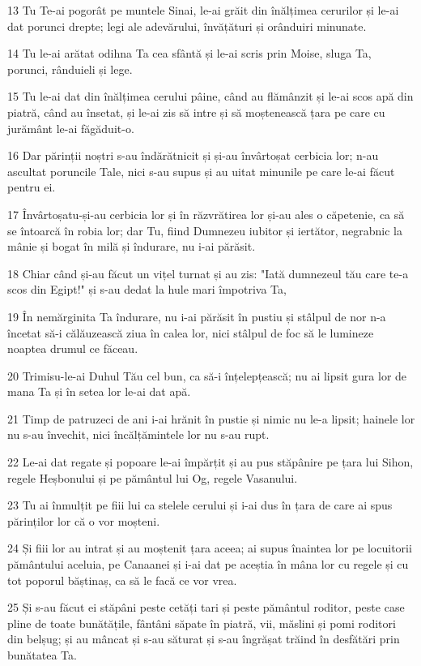 \par 13 Tu Te-ai pogorât pe muntele Sinai, le-ai grăit din înălțimea cerurilor și le-ai dat porunci drepte; legi ale adevărului, învățături și orânduiri minunate.
\par 14 Tu le-ai arătat odihna Ta cea sfântă și le-ai scris prin Moise, sluga Ta, porunci, rânduieli și lege.
\par 15 Tu le-ai dat din înălțimea cerului pâine, când au flămânzit și le-ai scos apă din piatră, când au însetat, și le-ai zis să intre și să moștenească țara pe care cu jurământ le-ai făgăduit-o.
\par 16 Dar părinții noștri s-au îndărătnicit și și-au învârtoșat cerbicia lor; n-au ascultat poruncile Tale, nici s-au supus și au uitat minunile pe care le-ai făcut pentru ei.
\par 17 Învârtoșatu-și-au cerbicia lor și în răzvrătirea lor și-au ales o căpetenie, ca să se întoarcă în robia lor; dar Tu, fiind Dumnezeu iubitor și iertător, negrabnic la mânie și bogat în milă și îndurare, nu i-ai părăsit.
\par 18 Chiar când și-au făcut un vițel turnat și au zis: "Iată dumnezeul tău care te-a scos din Egipt!" și s-au dedat la hule mari împotriva Ta,
\par 19 În nemărginita Ta îndurare, nu i-ai părăsit în pustiu și stâlpul de nor n-a încetat să-i călăuzească ziua în calea lor, nici stâlpul de foc să le lumineze noaptea drumul ce făceau.
\par 20 Trimisu-le-ai Duhul Tău cel bun, ca să-i înțelepțească; nu ai lipsit gura lor de mana Ta și în setea lor le-ai dat apă.
\par 21 Timp de patruzeci de ani i-ai hrănit în pustie și nimic nu le-a lipsit; hainele lor nu s-au învechit, nici încălțămintele lor nu s-au rupt.
\par 22 Le-ai dat regate și popoare le-ai împărțit și au pus stăpânire pe țara lui Sihon, regele Heșbonului și pe pământul lui Og, regele Vasanului.
\par 23 Tu ai înmulțit pe fiii lui ca stelele cerului și i-ai dus în țara de care ai spus părinților lor că o vor moșteni.
\par 24 Și fiii lor au intrat și au moștenit țara aceea; ai supus înaintea lor pe locuitorii pământului aceluia, pe Canaanei și i-ai dat pe aceștia în mâna lor cu regele și cu tot poporul băștinaș, ca să le facă ce vor vrea.
\par 25 Și s-au făcut ei stăpâni peste cetăți tari și peste pământul roditor, peste case pline de toate bunătățile, fântâni săpate în piatră, vii, măslini și pomi roditori din belșug; și au mâncat și s-au săturat și s-au îngrășat trăind în desfătări prin bunătatea Ta.
